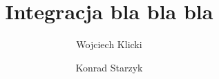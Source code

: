 \documentclass{article}
\begin{document}
\title{Integracja bla bla bla}
\author{Wojciech Klicki 	\and Konrad Starzyk}
\date{}
\maketitle
\tableofcontents
\clearpage


 
\end{document}
